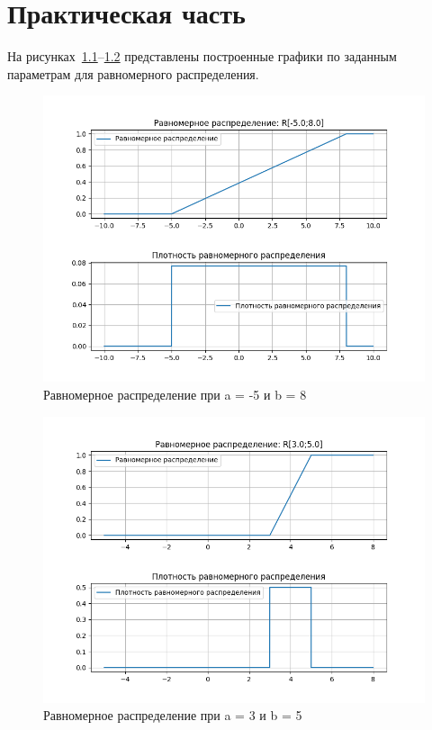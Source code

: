\chapter{Практическая часть}

На рисунках~\ref{ex:uniform_1}--\ref{ex:uniform_2} представлены построенные графики по заданным параметрам для равномерного распределения.

\begin{figure}[ht!]
	\centering
	\includegraphics[width=1.0\linewidth]{img/uniform1.png}
	\caption{Равномерное распределение при a = -5 и b = 8}
	\label{ex:uniform_1}
\end{figure}

\clearpage

\begin{figure}[ht!]
	\centering
	\includegraphics[width=1.0\linewidth]{img/uniform2.png}
	\caption{Равномерное распределение при a = 3 и b = 5}
	\label{ex:uniform_2}
\end{figure}

